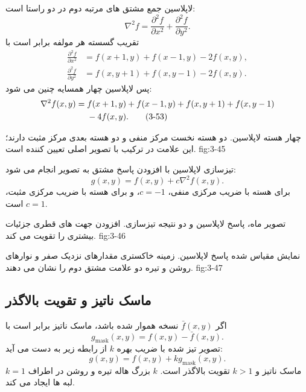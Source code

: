 لاپلاسین جمع مشتق های مرتبه دوم در دو راستا است:
\begin{equation}
  \nabla^2 f=\frac{\partial^2f}{\partial x^2}+\frac{\partial^2f}{\partial y^2}.
  \tag{3-50}\label{eq:3-50}
\end{equation}
تقریب گسسته هر مولفه برابر است با
\begin{align}
  \frac{\partial^2f}{\partial x^2}&=f(x+1,y)+f(x-1,y)-2f(x,y),
  \tag{3-51}\label{eq:3-51}\\
  \frac{\partial^2f}{\partial y^2}&=f(x,y+1)+f(x,y-1)-2f(x,y).
  \tag{3-52}\label{eq:3-52}
\end{align}
پس لاپلاسین چهار همسایه چنین می شود:
\begin{align}
\nabla^2f(x,y)={}&f(x+1,y)+f(x-1,y)+f(x,y+1)+f(x,y-1)\notag\\
&-4f(x,y).
\tag{3-53}\label{eq:3-53}
\end{align}

{چهار هسته لاپلاسین. دو هسته نخست مرکز منفی و دو هسته بعدی مرکز مثبت دارند؛
این علامت در ترکیب با تصویر اصلی تعیین کننده است.}
{fig:3-45}

تیزسازی لاپلاسین با افزودن پاسخ مشتق به تصویر انجام می شود:
\begin{equation}
  g(x,y)=f(x,y)+c\nabla^2f(x,y).
  \tag{3-54}\label{eq:3-54}
\end{equation}
برای هسته با ضریب مرکزی منفی، \(c=-1\)، و برای هسته با ضریب مرکزی مثبت،
\(c=1\) است.

{تصویر ماه، پاسخ لاپلاسین و دو نتیجه تیزسازی. افزودن جهت های قطری جزئیات
بیشتری را تقویت می کند.}
{fig:3-46}

{نمایش مقیاس شده پاسخ لاپلاسین. زمینه خاکستری مقدارهای نزدیک صفر و نوارهای
روشن و تیره دو علامت مشتق دوم را نشان می دهند.}
{fig:3-47}

\subsection{ماسک ناتیز و تقویت بالاگذر}

اگر \(\bar f(x,y)\) نسخه هموار شده باشد، ماسک ناتیز برابر است با
\begin{equation}
  g_{\mathrm{mask}}(x,y)=f(x,y)-\bar f(x,y).
  \tag{3-55}\label{eq:3-55}
\end{equation}
تصویر تیز شده با ضریب بهره \(k\) از رابطه زیر به دست می آید:
\begin{equation}
  g(x,y)=f(x,y)+k g_{\mathrm{mask}}(x,y).
  \tag{3-56}\label{eq:3-56}
\end{equation}
\(k=1\) ماسک ناتیز و \(k>1\) تقویت بالاگذر است. \(k\) بزرگ هاله تیره و روشن
در اطراف لبه ها ایجاد می کند.

